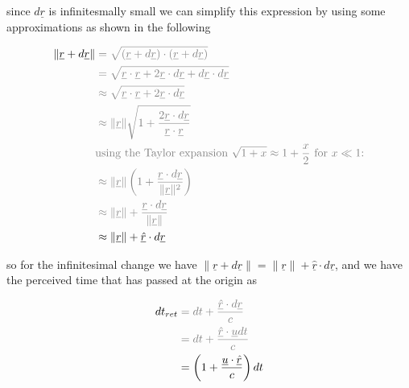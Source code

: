 since $d\underline{r}$ is infinitesmally small we can simplify this expression by using some approximations as shown in the following

\begin{equation}
	\begin{aligned}
		\|\underline{r} + d\underline{r}\| & \color{gray} =  \sqrt{(\underline{r} + d\underline{r}) \cdot (\underline{r} + d\underline{r})}                                       \\
		                                   & \color{gray} = \sqrt{\underline{r} \cdot \underline{r} + 2 \underline{r} \cdot d\underline{r} + d\underline{r} \cdot d\underline{r}} \\
		                                   & \color{gray} \approx \sqrt{\underline{r} \cdot \underline{r} + 2 \underline{r} \cdot d\underline{r}}                                 \\
		                                   & \color{gray} \approx \|\underline{r}\| \sqrt{ 1 + \frac{2 \underline{r} \cdot d\underline{r}}{\underline{r} \cdot \underline{r}}}    \\
		                                   & \color{gray} \text{using the Taylor expansion $\sqrt{1 + x} \approx 1 + \frac{x}{2} \text{ for } x \ll 1$:}                          \\
		                                   & \color{gray} \approx \|\underline{r}\| \left(1 + \frac{\underline{r} \cdot d\underline{r}}{\|\underline{r}\|^2 }\right)              \\
		                                   & \color{gray} \approx \|\underline{r}\|  + \frac{\underline{r} \cdot d\underline{r}}{\|\underline{r}\|}                               \\
		                                   & \approx \|\underline{r}\|  + \underline{\hat{r}} \cdot d\underline{r}
	\end{aligned}
\end{equation}

so for the infinitesimal change we have $\|\underline{r} + d\underline{r}\|= \|\underline{r}\|   + \underline{\hat{r}} \cdot d\underline{r}$, and we have the perceived time that has passed at the origin as

\begin{equation}
	\begin{aligned}
		dt_{ret} & \color{gray} =   dt + \frac{\underline{\hat{r}} \cdot d\underline{r}}{c}     \\
		         & \color{gray} = dt + \frac{\underline{\hat{r}} \cdot \underline{u} dt}{ c}    \\
		         & = \left( 1 + \frac{ \underline{u} \cdot \underline{\hat{r}} }{ c} \right) dt
	\end{aligned}
\end{equation}

